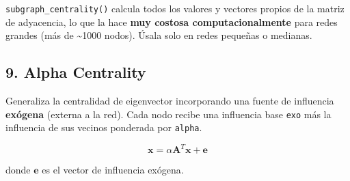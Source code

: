 \documentclass[
  letterpaper,
  DIV=11,
  numbers=noendperiod]{scrreprt}
\begin{document}
\begin{tcolorbox}[enhanced jigsaw, toprule=.15mm, colframe=quarto-callout-warning-color-frame, coltitle=black, titlerule=0mm, colback=white, breakable, leftrule=.75mm, arc=.35mm, bottomtitle=1mm, toptitle=1mm, rightrule=.15mm, bottomrule=.15mm, left=2mm, title=\textcolor{quarto-callout-warning-color}{\faExclamationTriangle}\hspace{0.5em}{⚠️ Error frecuente}, colbacktitle=quarto-callout-warning-color!10!white, opacityback=0, opacitybacktitle=0.6]

\texttt{subgraph\_centrality()} calcula todos los valores y vectores
propios de la matriz de adyacencia, lo que la hace \textbf{muy costosa
computacionalmente} para redes grandes (más de \textasciitilde1000
nodos). Úsala solo en redes pequeñas o medianas.

\end{tcolorbox}

\subsection{9. Alpha Centrality}\label{alpha-centrality}

Generaliza la centralidad de eigenvector incorporando una fuente de
influencia \textbf{exógena} (externa a la red). Cada nodo recibe una
influencia base \texttt{exo} más la influencia de sus vecinos ponderada
por \texttt{alpha}.

\[
\mathbf{x} = \alpha \mathbf{A}^T \mathbf{x} + \mathbf{e}
\]

donde \(\mathbf{e}\) es el vector de influencia exógena.
\end{document}

